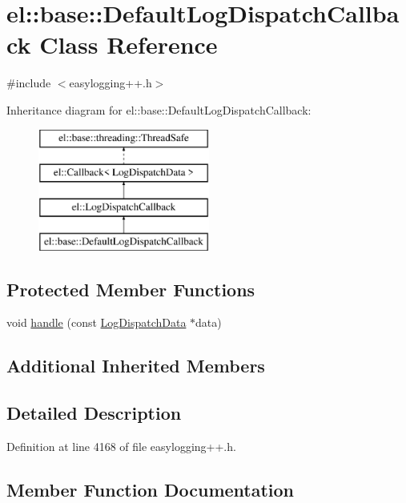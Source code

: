 \hypertarget{classel_1_1base_1_1_default_log_dispatch_callback}{}\section{el\+:\+:base\+:\+:Default\+Log\+Dispatch\+Callback Class Reference}
\label{classel_1_1base_1_1_default_log_dispatch_callback}


{\ttfamily \#include $<$easylogging++.\+h$>$}

Inheritance diagram for el\+:\+:base\+:\+:Default\+Log\+Dispatch\+Callback\+:\begin{figure}[H]
\begin{center}
\leavevmode
\includegraphics[height=4.000000cm]{classel_1_1base_1_1_default_log_dispatch_callback}
\end{center}
\end{figure}
\subsection*{Protected Member Functions}
\begin{DoxyCompactItemize}
\item 
void \hyperlink{classel_1_1base_1_1_default_log_dispatch_callback_acdac30f202c245500e6d94c55eee6d95}{handle} (const \hyperlink{classel_1_1_log_dispatch_data}{Log\+Dispatch\+Data} $\ast$data)
\end{DoxyCompactItemize}
\subsection*{Additional Inherited Members}


\subsection{Detailed Description}


Definition at line 4168 of file easylogging++.\+h.



\subsection{Member Function Documentation}
\hypertarget{classel_1_1base_1_1_default_log_dispatch_callback_acdac30f202c245500e6d94c55eee6d95}{}
